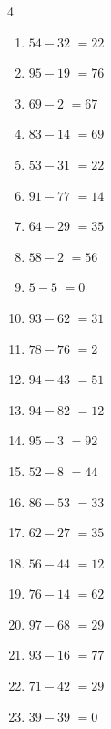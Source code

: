 \begin{multicols}{4}
\begin{enumerate}
  \item $54-32$
        $=22$

  \item $95-19$
        $=76$

  \item $69-2$
        $=67$

  \item $83-14$
        $=69$

  \item $53-31$
        $=22$

  \item $91-77$
        $=14$

  \item $64-29$
        $=35$

  \item $58-2$
        $=56$

  \item $5-5$
        $=0$

  \item $93-62$
        $=31$

  \item $78-76$
        $=2$

  \item $94-43$
        $=51$

  \item $94-82$
        $=12$

  \item $95-3$
        $=92$

  \item $52-8$
        $=44$

  \item $86-53$
        $=33$

  \item $62-27$
        $=35$

  \item $56-44$
        $=12$

  \item $76-14$
        $=62$

  \item $97-68$
        $=29$

  \item $93-16$
        $=77$

  \item $71-42$
        $=29$

  \item $39-39$
        $=0$

\columnbreak %


\end{enumerate}
\end{multicols}
